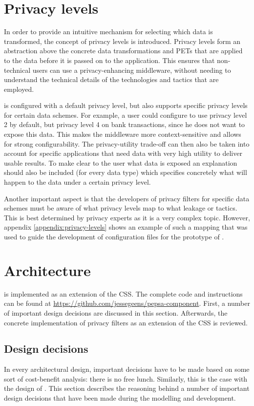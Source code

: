 \section{Privacy levels}
\label{sec:privacylevels}
\noindent In order to provide an intuitive mechanism for selecting which data is transformed, the concept of privacy levels is introduced. Privacy levels form an abstraction above the concrete data transformations and \gls{PETs} that are applied to the data before it is passed on to the application. This ensures that non-technical users can use a privacy-enhancing middleware, without needing to understand the technical details of the technologies and tactics that are employed. 

\middleware{} is configured with a default privacy level, but also supports specific privacy levels for certain data schemes. For example, a user could configure \middleware{} to use privacy level 2 by default, but privacy level 4 on bank transactions, since he does not want to expose this data. This makes the middleware more context-sensitive and allows for strong configurability. The privacy-utility trade-off can then also be taken into account for specific applications that need data with very high utility to deliver usable results. To make clear to the user what data is exposed an explanation should also be included (for every data type) which specifies concretely what will happen to the data under a certain privacy level.

Another important aspect is that the developers of privacy filters for specific data schemes must be aware of what privacy levels map to what leakage or tactics. This is best determined by privacy experts as it is a very complex topic. However, appendix \ref{appendix:privacy-levels} shows an example of such a mapping that was used to guide the development of configuration files for the prototype of \middleware{}.

\section{Architecture}
\label{sec:implementation}
\middleware{} is implemented as an extension of the \acrlong{CSS}. The complete code and instructions can be found at \url{https://github.com/jessegeens/pepsa-component}. First, a number of important design decisions are discussed in this section. Afterwards, the concrete implementation of privacy filters as an extension of the \gls{CSS} is reviewed.

\subsection{Design decisions}
\label{sec:design-decisions}
In every architectural design, important decisions have to be made based on some sort of cost-benefit analysis: there is no free lunch. Similarly, this is the case with the design of \middleware{}. This section describes the reasoning behind a number of important design decisions that have been made during the modelling and development.

